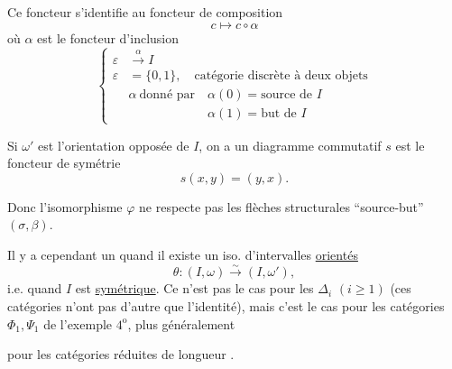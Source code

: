 Ce foncteur s'identifie au foncteur de composition
\[ c\longmapsto c\circ\alpha \]
où $\alpha$ est le foncteur d'inclusion
\[ \left\{\begin{aligned}
\varepsilon&\xrightarrow{\alpha} I\\
\varepsilon&=\{0,1\},\quad\text{catégorie discrète à deux objets}\\
&\alpha\ \text{donné par}\quad \alpha(0)=\text{source de }I\\
&\phantom{\alpha\ \text{donné par}\quad}\alpha(1)=\text{but de }I
\end{aligned}\right. \]

\unsure{$\rightarrow$|,} Si $\omega'$ est l'orientation opposée de $I$, on a un diagramme commutatif
$s$ est le foncteur de symétrie
\[ s(x,y)=(y,x). \]

Donc l'isomorphisme $\varphi$ ne respecte pas les flèches structurales ``source-but'' $(\sigma,\beta)$.

Il y a cependant un  quand il existe un iso. d'intervalles \uline{orientés}
\[ \theta\colon(I,\omega)\xrightarrow{\sim}(I,\omega'), \]
i.e. quand $I$ est \uline{symétrique}. Ce n'est pas le cas pour les $\mathbb{\Delta}_i$ $(i\geq 1)$ (ces catégories n'ont pas d'autre  que l'identité), mais c'est le cas pour les catégories $\Phi_1,\Psi_1$ de l'exemple $4^{\mathrm{o}}$, plus généralement 

pour les catégories réduites de longueur \uline{}.

